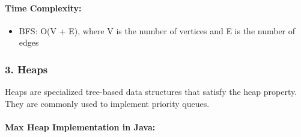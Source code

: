 \hypertarget{time-complexity-4}{%
\paragraph{Time Complexity:}\label{time-complexity-4}}

\begin{itemize}
\tightlist
\item
  BFS: O(V + E), where V is the number of vertices and E is the number
  of edges
\end{itemize}

\hypertarget{heaps}{%
\subsubsection{3. Heaps}\label{heaps}}

Heaps are specialized tree-based data structures that satisfy the heap
property. They are commonly used to implement priority queues.

\hypertarget{max-heap-implementation-in-java}{%
\paragraph{Max Heap Implementation in
Java:}\label{max-heap-implementation-in-java}}

